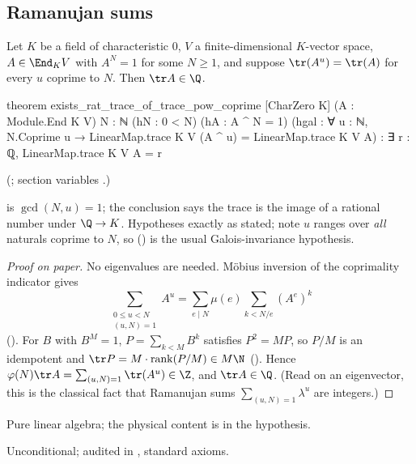 \subsection{Ramanujan sums}

\begin{theorem}\label{ch22:thm:ramanujan}
Let $K$ be a field of characteristic $0$, $V$ a finite-dimensional $K$-vector space, $A\in\End_K V$ with $A^N=1$ for some
$N\ge1$, and suppose $\tr(A^u)=\tr(A)$ for every $u$ coprime to $N$.  Then $\tr A\in\Q$.
\end{theorem}
\begin{leancode}
theorem exists_rat_trace_of_trace_pow_coprime [CharZero K] (A : Module.End K V) {N : ℕ}
    (hN : 0 < N) (hA : A ^ N = 1)
    (hgal : ∀ u : ℕ, N.Coprime u → LinearMap.trace K V (A ^ u) = LinearMap.trace K V A) :
    ∃ r : ℚ, LinearMap.trace K V A = r
\end{leancode}
(; section variables
.)
\begin{dictionary}
 is $\gcd(N,u)=1$; the conclusion  says the trace is the image of a
rational number under $\Q\to K$.  Hypotheses exactly as stated; note $u$ ranges over \emph{all} naturals coprime to $N$, so
() is the usual Galois-invariance hypothesis.
\end{dictionary}
\begin{proof}[Proof on paper]
No eigenvalues are needed.  Möbius inversion of the coprimality indicator gives
\begin{equation*}
  \sum_{\substack{0\le u<N\\(u,N)=1}}A^u=\sum_{e\mid N}\mu(e)\sum_{k<N/e}(A^e)^k
\end{equation*}
().  For $B$ with $B^M=1$, $P=\sum_{k<M}B^k$ satisfies $P^2=MP$, so $P/M$ is
an idempotent and $\tr P=M\cdot\mathrm{rank}(P/M)\in M\N$ ().  Hence
$\varphi(N)\tr A=\sum_{(u,N)=1}\tr(A^u)\in\Z$, and $\tr A\in\Q$.  (Read on an eigenvector, this is the classical fact that
Ramanujan sums $\sum_{(u,N)=1}\lambda^u$ are integers.)
\end{proof}
\begin{physics}Pure linear algebra; the physical content is in the hypothesis.\end{physics}
\begin{status}Unconditional; audited in , standard axioms.\end{status}

